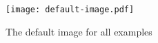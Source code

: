 \begin{figure}
	\begin{center}
		\texttt{[image: default-image.pdf]}
	\end{center}
	\caption[Default image]{The default image for all examples}
\end{figure}

\listoffigures

